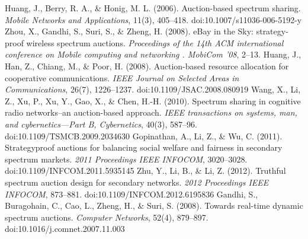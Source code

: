 \begin{thebibliography}{}
 Huang, J., Berry, R. A., \& Honig, M. L. (2006). Auction-based spectrum sharing. \textit{Mobile Networks and Applications}, 11(3), 405–418. doi:10.1007/s11036-006-5192-y
 Zhou, X., Gandhi, S., Suri, S., \& Zheng, H. (2008). eBay in the Sky: strategy-proof wireless spectrum auctions. \textit{Proceedings of the 14th ACM international conference on Mobile computing and networking . MobiCom  ’08}, 2–13.	
 Huang, J., Han, Z., Chiang, M., \& Poor, H. (2008). Auction-based resource allocation for cooperative communications. \textit{IEEE Journal on Selected Areas in Communications}, 26(7), 1226–1237. doi:10.1109/JSAC.2008.080919
 Wang, X., Li, Z., Xu, P., Xu, Y., Gao, X., \& Chen, H.-H. (2010). Spectrum sharing in cognitive radio networks--an auction-based approach. \textit{IEEE transactions on systems, man, and cybernetics—Part B, Cybernetics}, 40(3), 587–96. doi:10.1109/TSMCB.2009.2034630
 Gopinathan, A., Li, Z., \& Wu, C. (2011). Strategyproof auctions for balancing social welfare and fairness in secondary spectrum markets. \textit{2011 Proceedings IEEE INFOCOM}, 3020–3028. doi:10.1109/INFCOM.2011.5935145
 Zhu, Y., Li, B., \& Li, Z. (2012). Truthful spectrum auction design for secondary networks. \textit{2012 Proceedings IEEE INFOCOM}, 873–881. doi:10.1109/INFCOM.2012.6195836
 Gandhi, S., Buragohain, C., Cao, L., Zheng, H., \& Suri, S. (2008). Towards real-time dynamic spectrum auctions. \textit{Computer Networks}, 52(4), 879–897. doi:10.1016/j.comnet.2007.11.003


\end{thebibliography}
